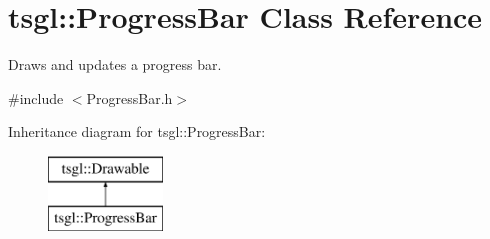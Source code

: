 \hypertarget{classtsgl_1_1_progress_bar}{}\section{tsgl\+:\+:Progress\+Bar Class Reference}
\label{classtsgl_1_1_progress_bar}


Draws and updates a progress bar.  




{\ttfamily \#include $<$Progress\+Bar.\+h$>$}

Inheritance diagram for tsgl\+:\+:Progress\+Bar\+:\begin{figure}[H]
\begin{center}
\leavevmode
\includegraphics[height=2.000000cm]{classtsgl_1_1_progress_bar}
\end{center}
\end{figure}

